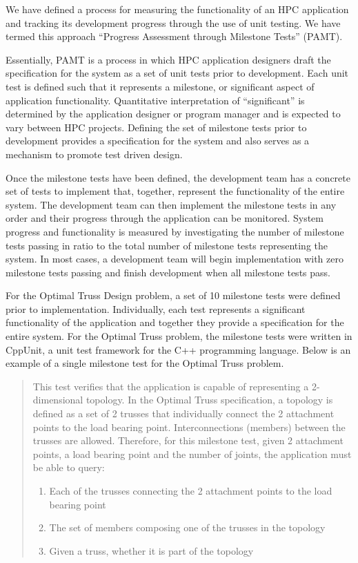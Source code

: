 \documentclass[times,10pt,twocolumn]{article}
\begin{document}

We have defined a process for measuring the functionality of an HPC
application and tracking its development progress through the use of unit
testing.  We have termed this approach ``Progress Assessment through
Milestone Tests'' (PAMT).

Essentially, PAMT is a process in which HPC application designers draft
the specification for the system as a set of unit tests prior to
development.  Each unit test is defined such that it represents a
milestone, or significant aspect of application functionality.
Quantitative interpretation of ``significant'' is determined by the
application designer or program manager and is expected to vary between
HPC projects.  Defining the set of milestone tests prior to development
provides a specification for the system and also serves as a mechanism to
promote test driven design.

Once the milestone tests have been defined, the development team has a
concrete set of tests to implement that, together, represent the
functionality of the entire system.  The development team can then
implement the milestone tests in any order and their progress through
the application can be monitored.  System progress and functionality
is measured by investigating the number of milestone tests passing in
ratio to the total number of milestone tests representing the system.
In most cases, a development team will begin implementation with zero
milestone tests passing and finish development when all milestone
tests pass.

For the Optimal Truss Design problem, a set of 10 milestone tests were
defined prior to implementation.  Individually, each test represents a
significant functionality of the application and together they provide a
specification for the entire system.  For the Optimal Truss problem, the
milestone tests were written in CppUnit, a unit test framework for the C++
programming language.  Below is an example of a single milestone test for
the Optimal Truss problem.

\begin{quotation}
 This test verifies that the application is 
capable of representing a 2-dimensional topology.  In the Optimal Truss
specification, a topology is defined as a set of 2 trusses that
individually connect the 2 attachment points to the load bearing
point.  Interconnections (members) between the trusses are allowed.
Therefore, for this milestone test, given 2 attachment points, a load
bearing point and the number of joints, the application must be able
to query:

\begin{enumerate}
\item Each of the trusses connecting the 2 attachment points to the load
bearing point
\item The set of members composing one of the trusses in the topology
\item Given a truss, whether it is part of the topology
\end{enumerate}
\end{quotation}
\end{document}
